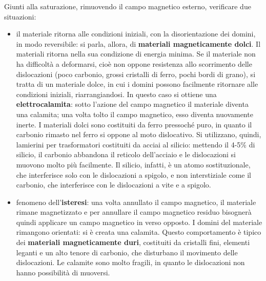 Giunti alla saturazione, rimuovendo il campo magnetico esterno, verificare due situazioni:
\begin{itemize}
    \item il materiale ritorna alle condizioni iniziali, con la disorientazione dei domini, in modo reversibile: si parla, allora, di \textbf{materiali magneticamente dolci}. Il materiali ritorna nella sua condizione di energia minima. Se il materiale non ha difficoltà a deformarsi, cioè non oppone resistenza allo scorrimento delle dislocazioni (poco carbonio, grossi cristalli di ferro, pochi bordi di grano), si tratta di un materiale dolce, in cui i domini possono facilmente ritornare alle condizioni iniziali, riarrangiandosi. In questo caso si ottiene una \textbf{elettrocalamita}: sotto l’azione del campo magnetico il materiale diventa una calamita; una volta tolto il campo magnetico, esso diventa nuovamente inerte. I materiali dolci sono costituiti da ferro pressoché puro, in quanto il carbonio rimasto nel ferro si oppone al moto dislocativo. Si utilizzano, quindi, lamierini per trasformatori costituiti da acciai al silicio: mettendo il 4-5\% di silicio, il carbonio abbandona il reticolo dell’acciaio e le dislocazioni si muovono molto più facilmente. Il silicio, infatti, è un atomo sostituzionale, che interferisce solo con le dislocazioni a spigolo, e non interstiziale come il carbonio, che interferisce con le dislocazioni a vite e a spigolo.
    \item fenomeno dell’\textbf{isteresi}: una volta annullato il campo magnetico, il materiale rimane magnetizzato e per annullare il campo magnetico residuo bisognerà quindi applicare un campo magnetico in verso opposto. I domini del materiale rimangono orientati: si è creata una calamita. Questo comportamento è tipico dei \textbf{materiali magneticamente duri}, costituiti da cristalli fini, elementi leganti e un alto tenore di carbonio, che disturbano il movimento delle dislocazioni. Le calamite sono molto fragili, in quanto le dislocazioni non hanno possibilità di muoversi.
\end{itemize}
